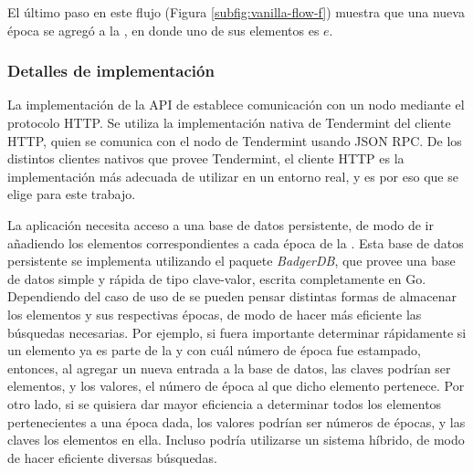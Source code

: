 %
El último paso en este flujo (Figura \ref{subfig:vanilla-flow-f}) muestra que una nueva época se agregó a la \setchain,
en donde uno de sus elementos es $e$.

\subsubsection{Detalles de implementación}\label{subsubsec:vanilla-implementantion}
La implementación de la API de \setchain establece comunicación con un nodo mediante el protocolo HTTP.
%
Se utiliza la implementación nativa de Tendermint del cliente HTTP,
quien se comunica con el nodo de Tendermint usando JSON RPC.
%
De los distintos clientes nativos que provee Tendermint, el cliente HTTP
es la implementación más adecuada de utilizar en un entorno
real, y es por eso que se elige para este trabajo.

La aplicación necesita acceso a una base de datos persistente, de modo de ir añadiendo
los elementos correspondientes a cada época de la \setchain.
%
Esta base de datos persistente se implementa utilizando el paquete \textit{BadgerDB}\cite{db.badger},
que provee una base de datos simple y rápida de tipo clave-valor, escrita completamente en Go.
%
Dependiendo del caso de uso de \setchain se pueden pensar distintas formas de almacenar los elementos y sus
respectivas épocas, de modo de hacer más eficiente las búsquedas necesarias.
%
Por ejemplo, si fuera importante determinar rápidamente si un elemento ya es parte de la \setchain y con cuál número de época
fue estampado, entonces, al agregar un nueva entrada a la base de datos, las claves podrían ser elementos, y los
valores, el número de época al que dicho elemento pertenece.
%
Por otro lado, si se quisiera dar mayor eficiencia a determinar todos los elementos pertenecientes a una época dada,
los valores podrían ser números de épocas, y las claves los elementos en ella.
%
Incluso podría utilizarse un sistema híbrido, de modo de hacer eficiente diversas búsquedas.

